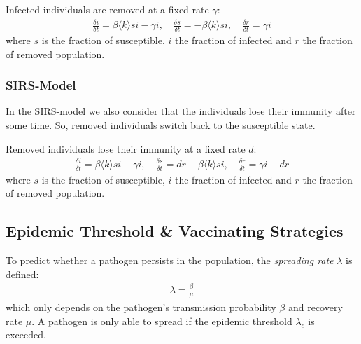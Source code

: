 \documentclass[english]{panikzettel}
\begin{document}
Infected individuals are removed at a fixed rate $ \gamma $:
\begin{align*}
	\frac{\delta i}{\delta t} = \beta \langle k \rangle si - \gamma i, \quad
	\frac{\delta s}{\delta t} = - \beta \langle k \rangle si, \quad 
	\frac{\delta r}{\delta t} = \gamma i
\end{align*}
where $ s $ is the fraction of susceptible, $ i $ the fraction of infected and $ r $ the fraction of removed population.

\subsubsection{SIRS-Model}
In the SIRS-model we also consider that the individuals lose their immunity after some time.
So, removed individuals switch back to the susceptible state.

\begin{figure}[ht!]
	\centering
\end{figure}

Removed individuals lose their immunity at a fixed rate $ d $:
\begin{align*}
	\frac{\delta i}{\delta t} = \beta \langle k \rangle si - \gamma i, \quad
	\frac{\delta s}{\delta t} = dr - \beta \langle k \rangle si, \quad 
	\frac{\delta r}{\delta t} = \gamma i - dr
\end{align*}
where $ s $ is the fraction of susceptible, $ i $ the fraction of infected and $ r $ the fraction of removed population.

\subsection{Epidemic Threshold \& Vaccinating Strategies}
To predict whether a pathogen persists in the population, the \emph{spreading rate} $ \lambda $ is defined:
\begin{align*}
	\lambda = \frac{\beta}{\mu}
\end{align*}
which only depends on the pathogen's transmission probability $ \beta $ and recovery rate $ \mu $.
A pathogen is only able to spread if the epidemic threshold $ \lambda_c $ is exceeded.
\end{document}
